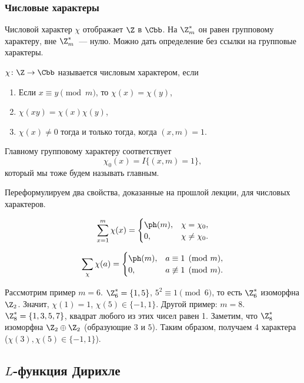 \subsubsection{Числовые характеры}

Числовой характер $\chi$ отображает $\Z$ в $\Cbb$. На $\Z_m^*$ он равен групповому характеру, вне $\Z_m^*$~— нулю. Можно дать определение без ссылки на групповые характеры.

\begin{df}
  $\chi \colon \Z \to \Cbb$  называется числовым характером, если
  \begin{enumerate}
    \item Если $x \equiv y \pmod m$, то $\chi(x) = \chi(y)$,
    \item $\chi(xy) = \chi(x) \chi(y)$,
    \item $\chi(x) \ne 0$ тогда и только тогда, когда $(x, m) = 1$.
  \end{enumerate}
\end{df}

Главному групповому характеру соответствует
$$
\chi_0(x) = I\{(x, m) = 1\},
$$
который мы тоже будем называть главным.

Переформулируем два свойства, доказанные на прошлой лекции, для числовых характеров.

\begin{stm}
  $$
    \sum_{x = 1}^m \chi(x) = \begin{cases}
      \ph(m),& \chi = \chi_0,\\
      0,& \chi \ne \chi_0.
    \end{cases}
  $$
\end{stm}

\begin{stm}
  $$
    \sum_{\chi} \chi(a) = \begin{cases}
      \ph(m),& a \equiv 1 \pmod m,\\
      0,& a \not \equiv 1 \pmod m.
    \end{cases}
  $$
\end{stm}

Рассмотрим пример $m = 6$. $\Z_6^* = \{1, 5\}$, $5^2 \equiv 1 \pmod 6$, то есть $\Z_6^*$ изоморфна $\Z_2$. Значит, $\chi(1) = 1$, $\chi(5) \in \{-1, 1\}$. Другой пример: $m = 8$. $\Z_8^* = \{1, 3, 5, 7\}$, квадрат любого из этих чисел равен 1. Заметим, что $\Z_8^*$ изоморфна $\Z_2 \oplus \Z_2$ (образующие $3$ и $5$). Таким образом, получаем 4 характера ($\chi(3), \chi(5) \in \{-1, 1\}$). 

\subsection{$L$-функция Дирихле}

